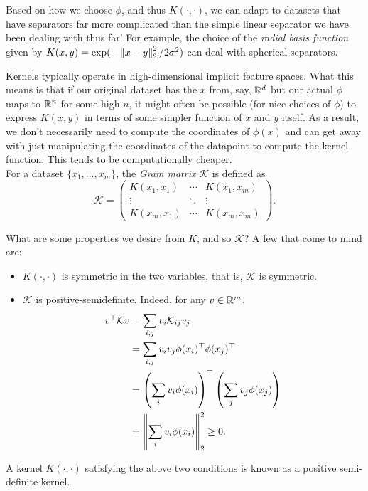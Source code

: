 \documentclass{article}
\begin{document}
		Based on how we choose $\phi$, and thus $K(\cdot,\cdot)$, we can adapt to datasets that have separators far more complicated than the simple linear separator we have been dealing with thus far! For example, the choice of the \emph{radial basis function} given by $K(x,y) = \exp(-\left\lVert x-y\right\rVert_2^2/2\sigma^2)$ can deal with spherical separators.

		Kernels typically operate in high-dimensional implicit feature spaces. What this means is that if our original dataset has the $x$ from, say, $\mathbb{R}^d$ but our actual $\phi$ maps to $\mathbb{R}^n$ for some high $n$, it might often be possible (for nice choices of $\phi$) to express $K(x,y)$ in terms of some simpler function of $x$ and $y$ itself. As a result, we don't necessarily need to compute the coordinates of $\phi(x)$ and can get away with just manipulating the coordinates of the datapoint to compute the kernel function. This tends to be computationally cheaper.\\

		For a dataset $\{x_1,\ldots,x_m\}$, the \emph{Gram matrix} $\mathcal{K}$ is defined as
		\[
		\mathcal{K} =
		\begin{pmatrix}
			K(x_1,x_1) & \cdots & K(x_1,x_m) \\
			\vdots & \ddots & \vdots \\
			K(x_m,x_1) & \cdots & K(x_m,x_m)
		\end{pmatrix}.
		\]

		What are some properties we desire from $K$, and so $\mathcal{K}$? A few that come to mind are:
		\begin{itemize}
			\item $K(\cdot,\cdot)$ is symmetric in the two variables, that is, $\mathcal{K}$ is symmetric.
			\item $\mathcal{K}$ is positive-semidefinite. Indeed, for any $v\in\mathbb{R}^m$,
			\begin{align*}
				v^\top\mathcal{K}v &= \sum_{i,j} v_i \mathcal{K}_{ij} v_j \\
					&= \sum_{i,j} v_i v_j \phi(x_i)^\top \phi(x_j)^\top \\
					&= \left(\sum_i v_i \phi(x_i)\right)^\top \left(\sum_j v_j \phi(x_j)\right) \\
					&= \left\lVert\sum_i v_i \phi(x_i)\right\rVert_2^2 \ge 0.
			\end{align*}
		\end{itemize}
		A kernel $K(\cdot,\cdot)$ satisfying the above two conditions is known as a positive semi-definite kernel.\\
\end{document}
